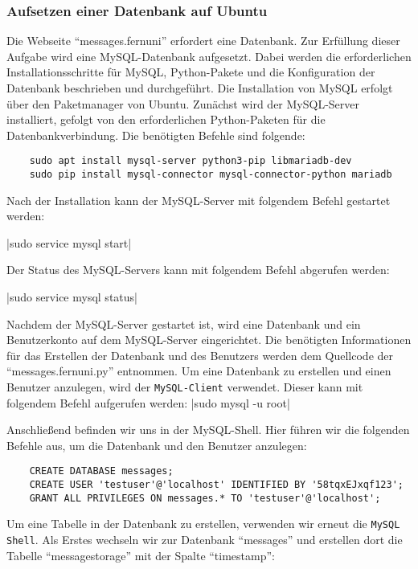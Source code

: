 \subsubsection{Aufsetzen einer Datenbank auf Ubuntu}

Die Webseite \enquote{messages.fernuni} erfordert eine Datenbank. Zur Erfüllung dieser Aufgabe wird eine MySQL-Datenbank aufgesetzt. Dabei werden die erforderlichen Installationsschritte für MySQL, Python-Pakete und die Konfiguration der Datenbank beschrieben und durchgeführt.
Die Installation von MySQL erfolgt über den Paketmanager von Ubuntu. Zunächst wird der MySQL-Server installiert, gefolgt von den erforderlichen Python-Paketen für die Datenbankverbindung. Die benötigten Befehle sind folgende:

\begin{verbatim}
    sudo apt install mysql-server python3-pip libmariadb-dev
    sudo pip install mysql-connector mysql-connector-python mariadb
\end{verbatim}

Nach der Installation kann der MySQL-Server mit folgendem Befehl gestartet werden:

|sudo service mysql start|

Der Status des MySQL-Servers kann mit folgendem Befehl abgerufen werden:

|sudo service mysql status|

Nachdem der MySQL-Server gestartet ist, wird eine Datenbank und ein Benutzerkonto auf dem MySQL-Server eingerichtet. Die benötigten Informationen für das Erstellen der Datenbank und des Benutzers werden dem Quellcode der \enquote{messages.fernuni.py} entnommen.
Um eine Datenbank zu erstellen und einen Benutzer anzulegen, wird der \verb+MySQL-Client+ verwendet. Dieser kann mit folgendem Befehl aufgerufen werden:
|sudo mysql -u root|

Anschließend befinden wir uns in der MySQL-Shell. Hier führen wir die folgenden Befehle aus, um die Datenbank und den Benutzer anzulegen:

\begin{verbatim}
    CREATE DATABASE messages;
    CREATE USER 'testuser'@'localhost' IDENTIFIED BY '58tqxEJxqf123';
    GRANT ALL PRIVILEGES ON messages.* TO 'testuser'@'localhost';
\end{verbatim}

Um eine Tabelle in der Datenbank zu erstellen, verwenden wir erneut die \verb+MySQL Shell+.
Als Erstes wechseln wir zur Datenbank \enquote{messages} und erstellen dort die Tabelle \enquote{messagestorage} mit der Spalte \enquote{timestamp}:

